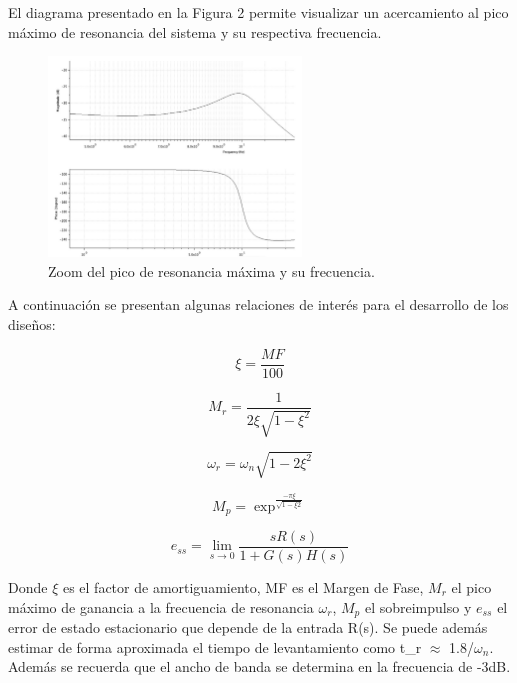 \documentclass[12pt,letterpaper]{article}
\begin{document}
El diagrama presentado en la Figura 2 permite visualizar un acercamiento al pico máximo de resonancia del sistema y su respectiva frecuencia.\\

\begin{figure}
  \centering
    \includegraphics[width=0.6\textwidth]{Fig2.jpg}
  \caption{Zoom del pico de resonancia máxima y su frecuencia.}
  \label{fig:ejemplo}
\end{figure}


A continuación se presentan algunas relaciones de interés para el desarrollo de los diseños:

\begin{equation}
    \xi = \frac{MF}{100}
\end{equation}

\begin{equation}
    M_r = \frac{1}{2\xi\sqrt{1-\xi^2}}
\end{equation}

\begin{equation}
    \omega_r = \omega_n \sqrt{1-2\xi^2}
\end{equation}

\begin{equation}
    M_p = \exp^\frac{-\pi\xi}{\sqrt{1-\xi2}}
\end{equation}


\begin{equation}
    e_{ss}= \lim_{s \to 0} \frac{sR(s)}{1+G(s)H(s)}
\end{equation}


Donde $\xi$ es el factor de amortiguamiento, MF es el Margen de Fase, $M_r$ el pico máximo de ganancia a la frecuencia de resonancia $\omega_r$, $M_p$ el sobreimpulso y $e_{ss}$ el error de estado estacionario que depende de la entrada R(s). Se puede además estimar de forma aproximada el tiempo de levantamiento como t_r $\approx$ 1.8/$\omega_n$. Además se recuerda que el ancho de banda se determina en la frecuencia de -3dB.
\end{document}
